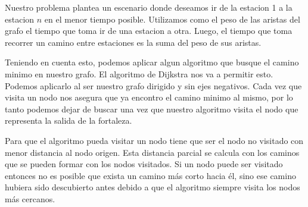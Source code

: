 

Nuestro problema plantea un escenario donde deseamos ir de la estacion 1 a la estacion $n$ en el menor tiempo posible. Utilizamos como el peso de las aristas del grafo el tiempo que toma ir de una estacion a otra. Luego, el tiempo que toma recorrer un camino entre estaciones es la suma del peso de sus aristas. 

Teniendo en cuenta esto, podemos aplicar algun algoritmo que busque el camino minimo en nuestro grafo. El algoritmo de Dijkstra nos va a permitir esto. Podemos aplicarlo al ser nuestro grafo dirigido y sin ejes negativos. Cada vez que visita un nodo nos asegura que ya encontro el camino minimo al mismo, por lo tanto podemos dejar de buscar una vez que nuestro algoritmo visita el nodo que representa la salida de la fortaleza. 

Para que el algoritmo pueda visitar un nodo tiene que ser el nodo no visitado con menor distancia al nodo origen. Esta distancia parcial se calcula con los caminos que se pueden formar con los nodos visitados. Si un nodo puede ser visitado entonces no es posible que exista un camino más corto hacia él, sino ese camino hubiera sido descubierto antes debido a que el algoritmo siempre visita los nodos más cercanos.



